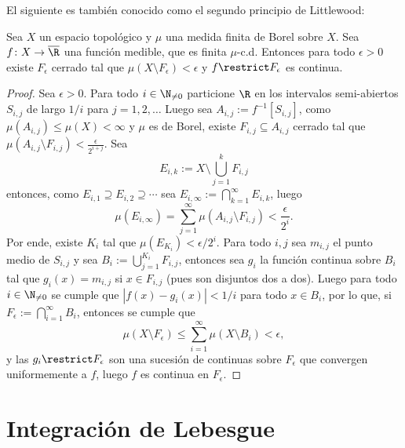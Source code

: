 El siguiente es también conocido como el segundo principio de Littlewood:
\begin{thmi}
	Sea $X$ un espacio topológico y $\mu$ una medida finita de Borel sobre $X$.
	Sea $f\colon X\to\overline\R$ una función medible, que es finita $\mu$-c.d.
	Entonces para todo $\epsilon > 0$ existe $F_\epsilon$ cerrado tal que $\mu(X \setminus F_\epsilon) < \epsilon$ y $f\restrict F_\epsilon$ es continua.
\end{thmi}
\begin{proof}
	Sea $\epsilon > 0$.
	Para todo $i\in\N_{\ne 0}$ particione $\R$ en los intervalos semi-abiertos $S_{i,j}$ de largo $1/i$ para $j = 1,2,\dots$
	Luego sea $A_{i,j} := f^{-1}[S_{i,j}]$, como $\mu(A_{i,j}) \le \mu(X) < \infty$ y $\mu$ es de Borel,
	existe $F_{i,j} \subseteq A_{i,j}$ cerrado tal que $\mu(A_{i,j} \setminus F_{i,j}) < \frac{\epsilon}{2^{i+j}}$.
	Sea
	$$ E_{i,k} := X \setminus \bigcup_{j=1}^k F_{i,j} $$
	entonces, como $E_{i,1} \supseteq E_{i,2} \supseteq \cdots$
	sea $E_{i,\infty} := \bigcap_{k=1}^\infty E_{i,k}$, luego
	$$ \mu(E_{i,\infty}) = \sum_{j=1}^\infty \mu(A_{i,j} \setminus F_{i,j}) < \frac{\epsilon}{2^i}. $$
	Por ende, existe $K_i$ tal que $\mu(E_{K_i}) < \epsilon/2^i$.
	Para todo $i,j$ sea $m_{i,j}$ el punto medio de $S_{i,j}$ y sea $B_i := \bigcup_{j=1}^{K_i} F_{i,j}$,
	entonces sea $g_i$ la función continua sobre $B_i$ tal que $g_i(x) = m_{i,j}$ si $x \in F_{i,j}$ (pues son disjuntos dos a dos).
	Luego para todo $i\in\N_{\ne 0}$ se cumple que $|f(x) - g_i(x)| < 1/i$ para todo $x\in B_i$, por lo que,
	si $F_\epsilon := \bigcap_{i=1}^\infty B_i$, entonces se cumple que
	$$ \mu(X \setminus F_\epsilon) \le \sum_{i=1}^\infty \mu(X\setminus B_i) < \epsilon, $$
	y las $g_i\restrict F_\epsilon$ son una sucesión de continuas sobre $F_\epsilon$ que convergen uniformemente a $f$, luego $f$ es continua en $F_\epsilon$.
\end{proof}

\section{Integración de Lebesgue}

